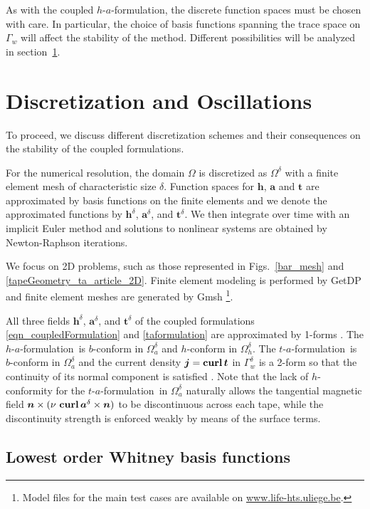 \documentclass[journal]{IEEEtran}
\renewcommand{\vec}[1]{\boldsymbol{#1}} %
\newcommand{\curl}{\text{\textbf{curl}}\, }
\renewcommand{\a}{\vec a}
\renewcommand{\t}{\vec t}
\newcommand{\n}{\vec n}
\newcommand{\h}{\vec h}
\renewcommand{\j}{\vec j}
\renewcommand{\O}{\Omega}
\newcommand{\haf}{$h$-$a$-formulation\ }
\newcommand{\taf}{$t$-$a$-formulation\ }
\newcommand{\Oad}{\Omega_a^\delta}
\newcommand{\Ohd}{\Omega_h^\delta}
\newcommand{\Gwd}{\Gamma_w^\delta}
\newcommand{\ad}{\vec a^{\delta}}
\newcommand{\td}{\vec t^{\delta}}
\newcommand{\hd}{\vec h^{\delta}}
\begin{document}
As with the coupled $h$-$a$-formulation, the discrete function spaces must be chosen with care. In particular, the choice of basis functions spanning the trace space on $\Gamma_w$ will affect the stability of the method. Different possibilities will be analyzed in section~\ref{sec_discretization}.

\section{Discretization and Oscillations}\label{sec_discretization}

To proceed, we discuss different discretization schemes and their consequences on the stability of the coupled formulations.

For the numerical resolution, the domain $\O$ is discretized as $\O^\delta$ with a finite element mesh of characteristic size $\delta$. Function spaces for $\h$, $\a$ and $\t$ are approximated by basis functions on the finite elements and we denote the approximated functions by $\hd$, $\ad$, and $\td$. We then integrate over time with an implicit Euler method and solutions to nonlinear systems are obtained by Newton-Raphson iterations.

We focus on 2D problems, such as those represented in Figs.~\ref{bar_mesh} and \ref{tapeGeometry_ta_article_2D}. Finite element modeling is performed by GetDP \cite{getdp} and finite element meshes are generated by Gmsh \cite{gmsh}\footnote{Model files for the main test cases are available on \url{www.life-hts.uliege.be}.}.

All three fields $\hd$, $\ad$, and $\td$ of the coupled formulations \eqref{eqn_coupledFormulation} and \eqref{taformulation} are approximated by 1-forms \cite{lindell2004differential}. The \haf is $b$-conform in $\Oad$ and $h$-conform in $\Ohd$. The \taf is $b$-conform in $\Oad$ and the current density $\j=\curl \t$ in $\Gwd$ is a 2-form so that the continuity of its normal component is satisfied \cite{lindell2004differential}. Note that the lack of $h$-conformity for the \taf in $\Oad$ naturally allows the tangential magnetic field $\n\times( \nu\ \curl \ad \times \n)$ to be discontinuous across each tape, while the discontinuity strength is enforced weakly by means of the surface terms.

\subsection{Lowest order Whitney basis functions}
\end{document}
